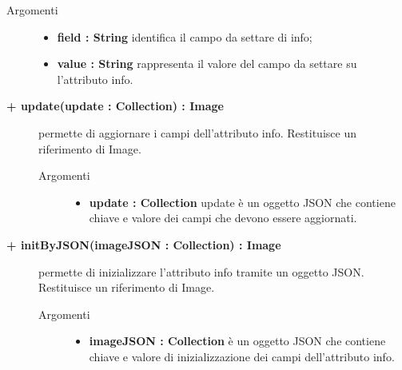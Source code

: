 \begin{description}
\begin{description}
		\begin{description}
			\item[Argomenti] \hfill
				\begin{itemize}
				
					\item \textbf{field : String			} \hfill
					identifica il campo da settare di info;
					\item \textbf{value : String			} \hfill
					rappresenta il valore del campo da settare su l'attributo info.
				\end{itemize}
		\end{description}

\end{description}

\begin{description}
		\item[\textbf{\color{blue}+ update(update : Collection) : Image			}] \hfill
			permette di aggiornare i campi dell'attributo info. Restituisce un riferimento di Image.
			
		\begin{description}
			\item[Argomenti] \hfill
				\begin{itemize}
				
					\item \textbf{update : Collection			} \hfill
					update è un oggetto JSON che contiene chiave e valore dei campi che devono essere aggiornati. 
				\end{itemize}
		\end{description}

\end{description}

\begin{description}
		\item[\textbf{\color{blue}+ initByJSON(imageJSON : Collection) : Image			}] \hfill
			permette di inizializzare l'attributo info tramite un oggetto JSON. Restituisce un riferimento di Image.
			
		\begin{description}
			\item[Argomenti] \hfill
				\begin{itemize}
				
					\item \textbf{imageJSON : Collection			} \hfill
					è un oggetto JSON che contiene chiave e valore di inizializzazione dei campi dell'attributo info. 
				\end{itemize}
		\end{description}


\end{description}
\end{description}
